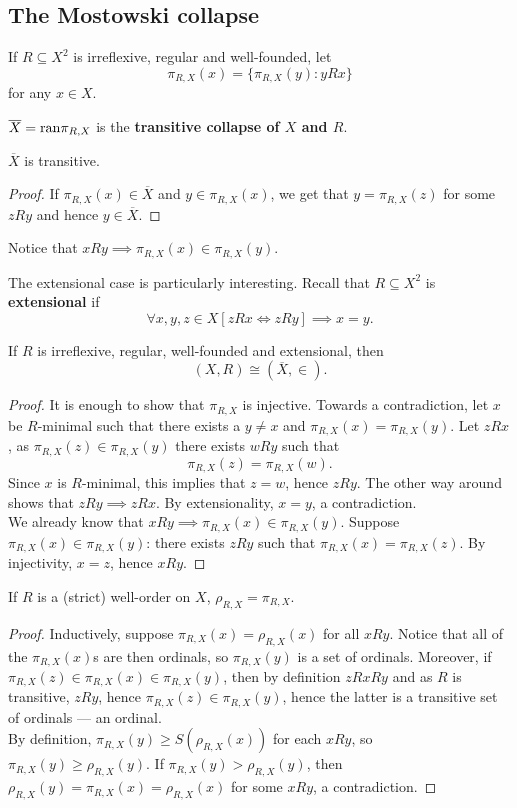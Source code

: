 \documentclass[twoside,openright,titlepage,numbers=noenddot,%
               headinclude,footinclude,cleardoublepage=empty,abstract=on,
               BCOR=23mm,paper=letter,fontsize=11pt
               ]{scrreprt}
\begin{document}
\subsection{The Mostowski collapse}
If $R \subseteq X^2$ is irreflexive, regular and well-founded, let
\[ \pi_{R,X}(x) = \{\pi_{R,X}(y): y R x\} \]
for any $x \in X$.
\begin{definition}
    $\overline{X} = \mathrm{ran}{\pi_{R,X}}$ is the \textbf{transitive collapse of $X$ and $R$}.
\end{definition}
\begin{proposition}
    $\overline{X}$ is transitive.
\end{proposition}
\begin{proof}
    If $\pi_{R,X}(x) \in \overline{X}$ and $y \in \pi_{R,X}(x)$, we get that $y = \pi_{R,X}(z)$ for some $z R y$ and hence $y \in \overline{X}$.
\end{proof}
\begin{remark}
    Notice that $x R y \implies \pi_{R,X}(x) \in \pi_{R,X}(y)$.
\end{remark}
The extensional case is particularly interesting. Recall that $R \subseteq X^2$ is \textbf{extensional} if
\[ \forall x,y,z \in X [z R x \iff z R y] \implies x = y. \]
\begin{theorem}
    If $R$ is irreflexive, regular, well-founded and extensional, then
    \[ (X,R) \cong (\overline{X},\in). \]
\end{theorem}
\begin{proof}
    It is enough to show that $\pi_{R,X}$ is injective. Towards a contradiction, let $x$ be $R$-minimal such that there exists a $y \neq x$ and $\pi_{R,X}(x) = \pi_{R,X}(y)$. Let $z R x$, as $\pi_{R,X}(z) \in \pi_{R,X}(y)$ there exists $w R y$ such that
    \[ \pi_{R,X}(z) = \pi_{R,X}(w). \]
    Since $x$ is $R$-minimal, this implies that $z = w$, hence $z R y$. The other way around shows that $z R y \implies z R x$. By extensionality, $x = y$, a contradiction. \\
    We already know that $x R y \implies \pi_{R,X}(x) \in \pi_{R,X}(y)$. Suppose $\pi_{R,X}(x) \in \pi_{R,X}(y)$: there exists $z R y$ such that $\pi_{R,X}(x) = \pi_{R,X}(z)$. By injectivity, $x = z$, hence $x R y$.
\end{proof}
\begin{proposition}
    If $R$ is a (strict) well-order on $X$, $\rho_{R,X} = \pi_{R,X}$.
\end{proposition}
\begin{proof}
    Inductively, suppose $\pi_{R,X}(x) = \rho_{R,X}(x)$ for all $x R y$. Notice that all of the $\pi_{R,X}(x)$s are then ordinals, so $\pi_{R,X}(y)$ is a set of ordinals. Moreover, if $\pi_{R,X}(z) \in \pi_{R,X}(x) \in \pi_{R,X}(y)$, then by definition $z R x R y$ and as $R$ is transitive, $z R y$, hence $\pi_{R,X}(z) \in \pi_{R,X}(y)$, hence the latter is a transitive set of ordinals --- an ordinal. \\
    By definition, $\pi_{R,X}(y) \geq S(\rho_{R,X}(x))$ for each $x R y$, so $\pi_{R,X}(y) \geq \rho_{R,X}(y)$. If $\pi_{R,X}(y) > \rho_{R,X}(y)$, then $\rho_{R,X}(y) = \pi_{R,X}(x) = \rho_{R,X}(x)$ for some $x R y$, a contradiction.
\end{proof}
\end{document}
